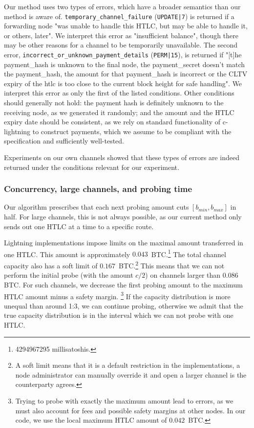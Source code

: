 Our method uses two types of errors, which have a broader semantics than our method is aware of.
\texttt{temporary\_channel\_failure} (\texttt{UPDATE|7}) is returned if a forwarding node "was unable to handle this HTLC, but may be able to handle it, or others, later".
We interpret this error as "insufficient balance", though there may be other reasons for a channel to be temporarily unavailable.
The second error, \texttt{incorrect\_or\_unknown\_payment\_details} (\texttt{PERM|15}), is returned if "[t]he payment\_hash is unknown to the final node, the payment\_secret doesn't match the payment\_hash, the amount for that payment\_hash is incorrect or the CLTV expiry of the htlc is too close to the current block height for safe handling".
We interpret this error as only the first of the listed conditions.
Other conditions should generally not hold: the payment hash is definitely unknown to the receiving node, as we generated it randomly; and the amount and the HTLC expiry date should be consistent, as we rely on standard functionality of c-lightning to construct payments, which we assume to be compliant with the specification and sufficiently well-tested.

Experiments on our own channels showed that these types of errors are indeed returned under the conditions relevant for our experiment.


\subsubsection{Concurrency, large channels, and probing time}

Our algorithm prescribes that each next probing amount cuts $[b_{min}, b_{max}]$ in half.
For large channels, this is not always possible, as our current method only sends out one HTLC at a time to a specific route.

Lightning implementations impose limits on the maximal amount transferred in one HTLC.
This amount is approximately $0.043$~BTC.\footnote{4294967295 millisatoshis.}
The total channel capacity also has a soft limit of  $0.167$~BTC.\footnote{A soft limit means that it is a default restriction in the implementations, a node administrator can manually override it and open a larger channel is the counterparty agrees.}
This means that we can not perform the initial probe (with the amount $c / 2$) on channels larger than $0.086$~ BTC.
For such channels, we decrease the first probing amount to the maximum HTLC amount minus a safety margin.
\footnote{Trying to probe with exactly the maximum amount lead to errors, as we must also account for fees and possible safety margins at other nodes. In our code, we use the local maximum HTLC amount of $0.042$~BTC.}
If the capacity distribution is more unequal than around 1:3, we can continue probing, otherwise we admit that the true capacity distribution is in the interval which we can not probe with one HTLC.

